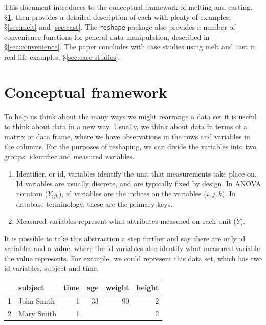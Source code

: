 \documentclass[oneside,letterpaper]{scrartcl}
\begin{document}
This document introduces to the conceptual framework of melting and casting, \S \ref{sec:framework}, then provides a detailed description of each with plenty of examples, \S \ref{sec:melt} and \ref{sec:cast}.  The {\tt reshape} package also provides a number of convenience functions for general data manipulation, described in \S \ref{sec:convenience}. The paper concludes with case studies using melt and cast in real life examples, \S \ref{sec:case-studies}.

\newpage
\section{Conceptual framework}\label{sec:framework}

To help us think about the many ways we might rearrange a data set it is useful to think about data in a new way.  Usually, we think about data in terms of a matrix or data frame, where we have observations in the rows and variables in the columns.  For the purposes of reshaping, we can divide the variables into two groups: identifier and measured variables.

\begin{enumerate}
	\item Identifier, or id, variables identify the unit that measurements take place on.  Id variables are usually discrete, and are typically fixed by design.  In ANOVA notation ($Y_{ijk}$), id variables are the indices on the variables ($i, j, k$).  In database terminology, these are the primary keys.
	\item Measured variables represent what attributes measured on each unit ($Y$).
\end{enumerate}

\noindent It is possible to take this abstraction a step further and say there are only id variables and a value, where the id variables also identify what measured variable the value represents.  For example, we could represent this data set, which has two id variables, subject and time, 

\bigskip

\begin{tabular}{|r|l|r||r|r|r|}
\hline
 & subject & time & age & weight & height \\
\hline
1 & John Smith & 1 & 33 & 90 & 2 \\
2 & Mary Smith & 1 &  &  & 2 \\
\hline
\end{tabular}
\end{document}
